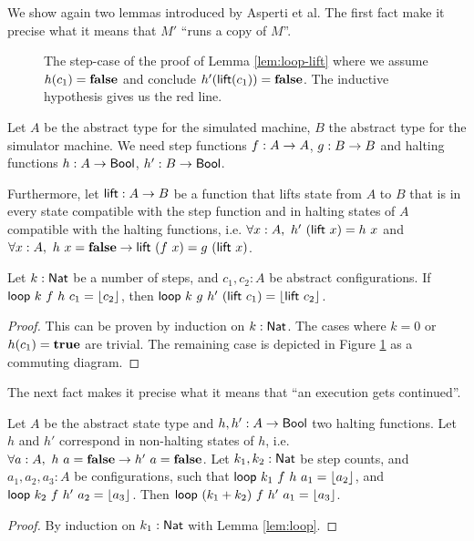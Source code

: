 \documentclass{psartcl}
\begin{document}
We show again two lemmas introduced by Asperti et al.
The first fact make it precise what it means that $M'$ ``runs a copy of $M$''.


\begin{figure}
  \center
  \caption{The step-case of the proof of Lemma \ref{lem:loop-lift} where we assume $h(c_1) = \mathbf{false}$ and conclude $h'(\textsf{lift}(c_1)) = \mathbf{false}$.
  The inductive hypothesis gives us the red line.}
  \label{fig:proof-loop-lift}
\end{figure}
\begin{lemma}
  \label{lem:loop-lift}
  Let $A$ be the abstract type for the simulated machine, $B$ the abstract type for the simulator machine.
  We need step functions $f : A \rightarrow A$, $g : B \rightarrow B$ and halting functions $h : A \rightarrow \textsf{Bool}$, $h' : B \rightarrow \textsf{Bool}$.

  Furthermore, let $\textsf{lift} : A \rightarrow B$ be a function that lifts state from $A$ to $B$ that is in every state compatible with the step function and
  in halting states of $A$ compatible with the halting functions, i.e.
  $\forall x:A,~h'~(\textsf{lift}~x) = h~x$ and $\forall x:A,~h~x = \mathbf{false} \rightarrow \textsf{lift}~(f~x) = g~(\textsf{lift}~x)$.

  Let $k:\textsf{Nat}$ be a number of steps, and $c_1, c_2:A$ be abstract configurations.
  If $\textsf{loop}~k~f~h~c_1 = \left\lfloor {c_2}\right\rfloor$, then $\textsf{loop}~k~g~h'~(\textsf{lift}~c_1) = \left\lfloor {\textsf{lift}~c_2}\right\rfloor$.
\end{lemma}
\begin{proof}
  This can be proven by induction on $k:\textsf{Nat}$.  The cases where $k=0$ or $h(c_1) = \mathbf{true}$ are trivial.
  The remaining case is depicted in Figure \ref{fig:proof-loop-lift} as a commuting diagram.
\end{proof}

The next fact makes it precise what it means that ``an execution gets continued''.

\begin{lemma}
  \label{lem:loop-merge}
  Let $A$ be the abstract state type and $h, h' : A \rightarrow \textsf{Bool}$ two halting functions.
  Let $h$ and $h'$ correspond in non-halting states of $h$, i.e.  $\forall a:A,~h~a = \mathbf{false} \rightarrow h'~a = \mathbf{false}$.
  Let $k_1, k_2:\textsf{Nat}$ be step counts, and $a_1, a_2, a_3:A$ be configurations, such that
  $\textsf{loop}~k_1~f~h~a_1 = \left\lfloor {a_2}\right\rfloor$, and $\textsf{loop}~k_2~f~h'~a_2 = \left\lfloor {a_3}\right\rfloor$.
  Then $\textsf{loop}~(k_1 + k_2)~f~h'~a_1 = \left\lfloor {a_3}\right\rfloor$.
\end{lemma}
\begin{proof}
  By induction on $k_1:\textsf{Nat}$ with Lemma \ref{lem:loop}.
\end{proof}
\end{document}

